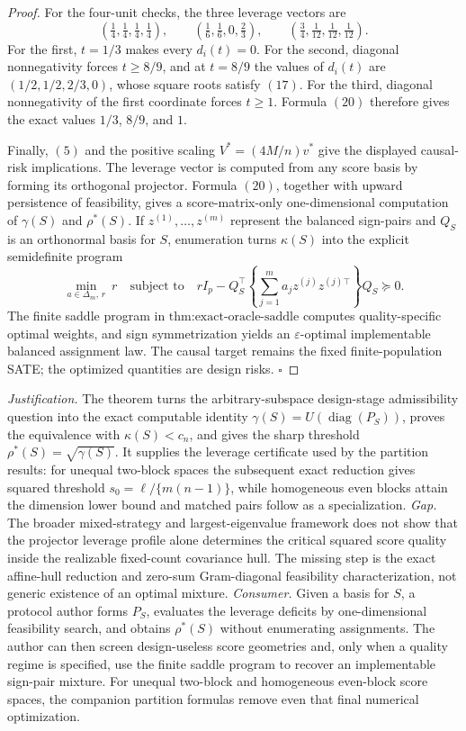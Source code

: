 \documentclass{article}
\begin{document}
\begin{proof}
For the four-unit checks, the three leverage vectors are
\[
\left(\tfrac14,\tfrac14,\tfrac14,\tfrac14\right),
\qquad
\left(\tfrac16,\tfrac16,0,\tfrac23\right),
\qquad
\left(\tfrac34,\tfrac1{12},\tfrac1{12},\tfrac1{12}\right).
\tag{23}
\]
For the first, \(t=1/3\) makes every \(d_i(t)=0\). For the second, diagonal nonnegativity forces \(t\geq8/9\), and at \(t=8/9\) the values of \(d_i(t)\) are \((1/2,1/2,2/3,0)\), whose square roots satisfy \((17)\). For the third, diagonal nonnegativity of the first coordinate forces \(t\geq1\). Formula \((20)\) therefore gives the exact values \(1/3\), \(8/9\), and \(1\).

Finally, \((5)\) and the positive scaling \(V^*=(4M/n)v^*\) give the displayed causal-risk implications. The leverage vector is computed from any score basis by forming its orthogonal projector. Formula \((20)\), together with upward persistence of feasibility, gives a score-matrix-only one-dimensional computation of \(\gamma(S)\) and \(\rho^*(S)\). If \(z^{(1)},\ldots,z^{(m)}\) represent the balanced sign-pairs and \(Q_S\) is an orthonormal basis for \(S\), enumeration turns \(\kappa(S)\) into the explicit semidefinite program
\[
\min_{a\in\Delta_m,\,r}\ r
\quad\text{subject to}\quad
rI_p-Q_S^\top\left\{\sum_{j=1}^m a_jz^{(j)}z^{(j)\top}\right\}Q_S\succeq0.
\tag{24}
\]
The finite saddle program in \(\text{thm:exact-oracle-saddle}\) computes quality-specific optimal weights, and sign symmetrization yields an \(\varepsilon\)-optimal implementable balanced assignment law. The causal target remains the fixed finite-population SATE; the optimized quantities are design risks. \(\square\)
\end{proof}
\par\smallskip\noindent \textit{Justification.} The theorem turns the arbitrary-subspace design-stage admissibility question into the exact computable identity \(\gamma(S)=U(\operatorname{diag}(P_S))\), proves the equivalence with \(\kappa(S)<c_n\), and gives the sharp threshold \(\rho^*(S)=\sqrt{\gamma(S)}\). It supplies the leverage certificate used by the partition results: for unequal two-block spaces the subsequent exact reduction gives squared threshold \(s_0=\ell/\{m(n-1)\}\), while homogeneous even blocks attain the dimension lower bound and matched pairs follow as a specialization. \textit{Gap.} The broader mixed-strategy and largest-eigenvalue framework does not show that the projector leverage profile alone determines the critical squared score quality inside the realizable fixed-count covariance hull. The missing step is the exact affine-hull reduction and zero-sum Gram-diagonal feasibility characterization, not generic existence of an optimal mixture. \textit{Consumer.} Given a basis for \(S\), a protocol author forms \(P_S\), evaluates the leverage deficits by one-dimensional feasibility search, and obtains \(\rho^*(S)\) without enumerating assignments. The author can then screen design-useless score geometries and, only when a quality regime is specified, use the finite saddle program to recover an implementable sign-pair mixture. For unequal two-block and homogeneous even-block score spaces, the companion partition formulas remove even that final numerical optimization.
\end{document}
